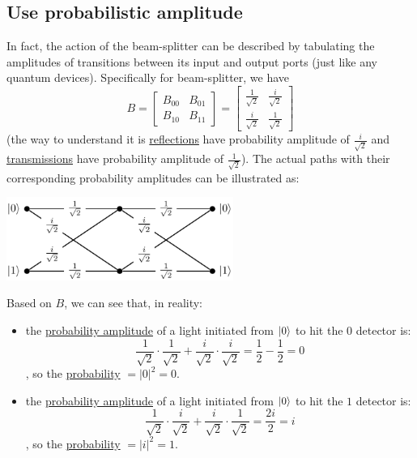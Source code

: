 \documentclass[12pt]{article}
\begin{document}
\subsection{Use probabilistic amplitude}
In fact, the action of the beam-splitter can be described by tabulating the amplitudes of transitions between its input and output ports (just like any quantum devices). Specifically for beam-splitter, we have $$
B = \begin{bmatrix}
B_{00} & B_{01}\\
B_{10} & B_{11}
\end{bmatrix} = \begin{bmatrix}
\frac{1}{\sqrt{2}} & \frac{i}{\sqrt{2}}\\
\frac{i}{\sqrt{2}} & \frac{1}{\sqrt{2}}
\end{bmatrix}
$$ (the way to understand it is \underline{reflections} have probability amplitude of $\frac{i}{\sqrt{2}}$ and \underline{transmissions} have probability amplitude of $\frac{1}{\sqrt{2}}$). The actual paths with their corresponding probability amplitudes can be illustrated as:
\begin{center}
\includegraphics[width = 20em]{images/2.jpg}
\end{center}

Based on $B$, we can see that, in reality:
\begin{itemize}
    \item the \underline{probability amplitude} of a light initiated from $\Ket{0}$ to hit the $0$ detector is: $$
    \frac{1}{\sqrt{2}} \cdot \frac{1}{\sqrt{2}} + \frac{i}{\sqrt{2}} \cdot \frac{i}{\sqrt{2}} = \frac{1}{2} - \frac{1}{2} = 0
    $$, so the \underline{probability} $= |0|^2 = 0$.
    \item the \underline{probability amplitude} of a light initiated from $\Ket{0}$ to hit the $1$ detector is: $$
    \frac{1}{\sqrt{2}} \cdot \frac{i}{\sqrt{2}} + \frac{i}{\sqrt{2}} \cdot \frac{1}{\sqrt{2}} = \frac{2i}{2} = i
    $$, so the \underline{probability} $= |i|^2 = 1$.
\end{itemize}
\end{document}
